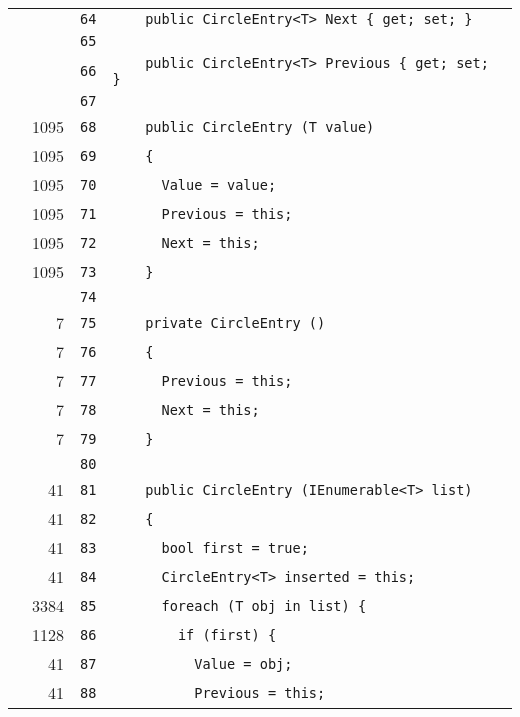 \documentclass[a4paper,10pt]{article}
\begin{document}
\begin{longtable}[l]{lrrl}
\cellcolor{gray} &  & \verb~64~ & \verb~    public CircleEntry<T> Next { get; set; }~\\
\cellcolor{gray} &  & \verb~65~ & \verb~~\\
\cellcolor{gray} &  & \verb~66~ & \verb~    public CircleEntry<T> Previous { get; set; }~\\
\cellcolor{gray} &  & \verb~67~ & \verb~~\\
\cellcolor{green} & 1095 & \verb~68~ & \verb~    public CircleEntry (T value)~\\
\cellcolor{green} & 1095 & \verb~69~ & \verb~    {~\\
\cellcolor{green} & 1095 & \verb~70~ & \verb~      Value = value;~\\
\cellcolor{green} & 1095 & \verb~71~ & \verb~      Previous = this;~\\
\cellcolor{green} & 1095 & \verb~72~ & \verb~      Next = this;~\\
\cellcolor{green} & 1095 & \verb~73~ & \verb~    }~\\
\cellcolor{gray} &  & \verb~74~ & \verb~~\\
\cellcolor{green} & 7 & \verb~75~ & \verb~    private CircleEntry ()~\\
\cellcolor{green} & 7 & \verb~76~ & \verb~    {~\\
\cellcolor{green} & 7 & \verb~77~ & \verb~      Previous = this;~\\
\cellcolor{green} & 7 & \verb~78~ & \verb~      Next = this;~\\
\cellcolor{green} & 7 & \verb~79~ & \verb~    }~\\
\cellcolor{gray} &  & \verb~80~ & \verb~~\\
\cellcolor{green} & 41 & \verb~81~ & \verb~    public CircleEntry (IEnumerable<T> list)~\\
\cellcolor{green} & 41 & \verb~82~ & \verb~    {~\\
\cellcolor{green} & 41 & \verb~83~ & \verb~      bool first = true;~\\
\cellcolor{green} & 41 & \verb~84~ & \verb~      CircleEntry<T> inserted = this;~\\
\cellcolor{green} & 3384 & \verb~85~ & \verb~      foreach (T obj in list) {~\\
\cellcolor{green} & 1128 & \verb~86~ & \verb~        if (first) {~\\
\cellcolor{green} & 41 & \verb~87~ & \verb~          Value = obj;~\\
\cellcolor{green} & 41 & \verb~88~ & \verb~          Previous = this;~\\

\end{longtable}
\end{document}

